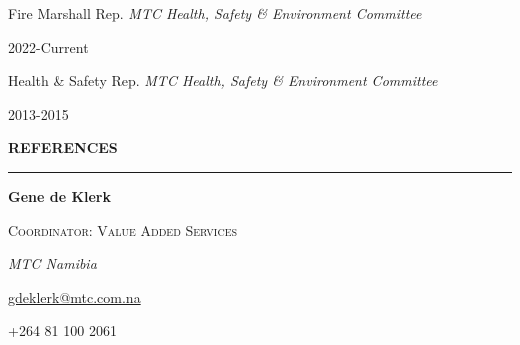 \documentclass[
  letterpaper,
  DIV=11,
  numbers=noendperiod]{scrartcl}
\begin{document}
\begin{large}
  \begin{multicols}{2}
    \begin{flushleft}
      Fire Marshall Rep.
      \textit{MTC Health, Safety \& Environment Committee}
      \end{flushleft}
    \begin{flushright}2022-Current\end{flushright}
  \end{multicols}
\end{large}

\begin{large}
  \begin{multicols}{2}
    \begin{flushleft}
      Health \& Safety Rep.
      \textit{MTC Health, Safety \& Environment Committee}
      \end{flushleft}
    \begin{flushright}2013-2015\end{flushright}
  \end{multicols}
\end{large}

\vspace{7pt}

\begin{large}
{\bf REFERENCES}
  \vspace{3pt}
  \hrule
  \begin{multicols}{2}
    \begin{flushleft}\textbf{Gene de Klerk}\end{flushleft}
  \end{multicols}
  \vspace{-0.17cm}
  \begin{multicols}{2}
    \begin{flushleft}\textsc{Coordinator: Value Added Services}\end{flushleft}
  \end{multicols}
  \vspace{-0.17cm}
  \begin{multicols}{2}
    \begin{flushleft}\textit{MTC Namibia}\end{flushleft}
  \end{multicols}
  \vspace{-0.17cm}
  \begin{multicols}{2}
    \begin{flushleft}\href{mailto:gdeklerk@mtc.com.na}{gdeklerk@mtc.com.na}\end{flushleft}
  \end{multicols}
  \vspace{-0.17cm}
  \begin{multicols}{2}
    \begin{flushleft}{+264 81 100 2061}\end{flushleft}
  \end{multicols}
\end{large}
\end{document}
